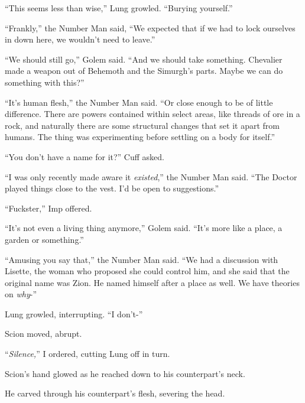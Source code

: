 ``This seems less than wise,'' Lung growled.  ``Burying yourself.''



``Frankly,'' the Number Man said, ``We expected that if we had to lock ourselves in down here, we wouldn't need to leave.''



``We should still go,'' Golem said.  ``And we should take something.  Chevalier made a weapon out of Behemoth and the Simurgh's parts.  Maybe we can do something with this?''



``It's human flesh,'' the Number Man said.  ``Or close enough to be of little difference.  There are powers contained within select areas, like threads of ore in a rock, and naturally there are some structural changes that set it apart from humans.  The thing was experimenting before settling on a body for itself.''



``You don't have a name for it?'' Cuff asked.



``I was only recently made aware it \emph{existed},'' the Number Man said.  ``The Doctor played things close to the vest.  I'd be open to suggestions.''



``Fuckster,'' Imp offered.



``It's not even a living thing anymore,'' Golem said.  ``It's more like a place, a garden or something.''



``Amusing you say that,'' the Number Man said.  ``We had a discussion with Lisette, the woman who proposed she could control him, and she said that the original name was Zion.  He named himself after a place as well.  We have theories on \emph{why}-''



Lung growled, interrupting.  ``I don't-''



Scion moved, abrupt.



``\emph{Silence,}'' I ordered, cutting Lung off in turn.



Scion's hand glowed as he reached down to his counterpart's neck.



He carved through his counterpart's flesh, severing the head.



